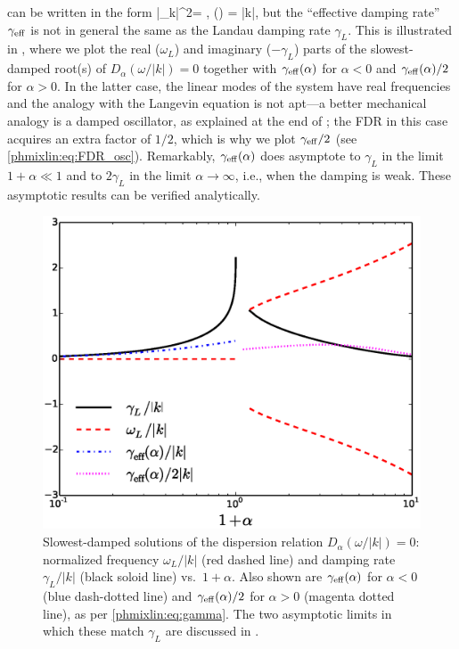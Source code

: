  can be written in the form 
\beq
\la|\phi_k|^2\ra = ,\quad 
\geff(\alpha) = |k|,
\label{phmixlin:eq:gamma}
\eeq  
but the ``effective damping rate'' $\gamma_{\rm eff}$ is not in general the same 
as the Landau damping rate $\gamma_L$.
This is illustrated in , where we plot 
the real ($\omega_L$) and imaginary ($-\gamma_L$) parts of the slowest-damped root(s) 
of $D_\alpha(\omega/|k|) = 0$ 
together with $\gamma_{\rm eff}(\alpha)$ for $\alpha<0$ and $\gamma_{\rm eff}(\alpha)/2$ for $\alpha>0$. 
In the latter case, the linear modes of the system have real frequencies and 
the analogy with the Langevin equation  is not apt---a better 
mechanical analogy is a damped oscillator, as explained at the end of 
; the FDR in this case acquires an extra factor of $1/2$, which is 
why we plot $\gamma_{\rm eff}/2$ (see \eqref{phmixlin:eq:FDR_osc}). Remarkably, $\gamma_{\rm eff}(\alpha)$ does 
asymptote to $\gamma_L$ in the limit $1+\alpha\ll1$ and to $2\gamma_L$ in the limit 
$\alpha\to\infty$, i.e., when the damping is weak. 
These asymptotic results can be verified analytically. 

\begin{figure}
\begin{center}
\includegraphics[width=14.8cm]{figs/phmixlin/gamma_omega.eps}
\caption{Slowest-damped solutions of the dispersion relation 
$D_\alpha(\omega/|k|)=0$: normalized frequency $\omega_L/|k|$ 
(red dashed line) and damping rate $\gamma_L/|k|$ (black soloid line)
vs.\ $1+\alpha$. Also shown are $\gamma_{\rm eff}(\alpha)$ for $\alpha<0$ (blue dash-dotted 
line) and $\gamma_{\rm eff}(\alpha)/2$ for $\alpha>0$ (magenta dotted line), as per 
\eqref{phmixlin:eq:gamma}. The two asymptotic limits in which these 
match $\gamma_L$ are discussed in .}
\label{phmixlin:fig:gamma_omega}
\end{center}
\end{figure}


